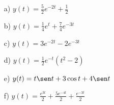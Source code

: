 \begin{resp}
 \begin{itemize}
  \item[a)] $y(t)=\frac{5}{2}e^{-2t}+\frac{1}{2}$
    \item[b)] $y(t)=\frac{1}{4}e^{t}+\frac{7}{4}e^{-3t}$
        \item[c)] $y(t)=3e^{-2t}-2e^{-3t}$
        \item[d)] $y(t)=\frac{1}{2}e^{-t}(t^2-2)$
        \item[e)] $y(t)= t \sen t + 3 \cos t +4 \sen t$
        \item[f)] $y(t)=\frac{e^{3t}}{2} + \frac{5e^{-4t}}{2} + \frac{e^{-3t}}{2}$
        \end{itemize}
\end{resp}



